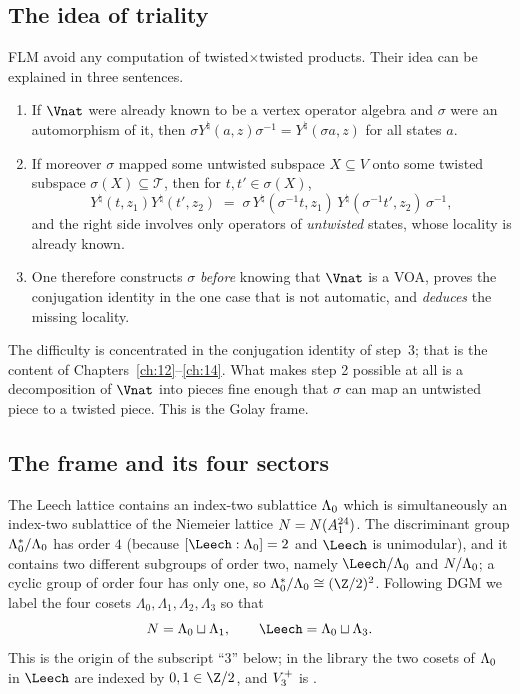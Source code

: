 \subsection{The idea of triality}

FLM avoid any computation of twisted$\times$twisted products.  Their idea can be explained in three
sentences.
\begin{enumerate}
  \item If $\Vnat$ were already known to be a vertex operator algebra and $\sigma$ were an
  automorphism of it, then $\sigma Y^\natural(a,z)\sigma^{-1}=Y^\natural(\sigma a,z)$ for all
  states $a$.
  \item If moreover $\sigma$ mapped some untwisted subspace $X\subseteq V$ onto some twisted
  subspace $\sigma(X)\subseteq\mathcal T$, then for $t,t'\in\sigma(X)$,
  \begin{equation*}
    Y^\natural(t,z_1)Y^\natural(t',z_2)\;=\;\sigma\,Y^\natural(\sigma^{-1}t,z_1)\,
    Y^\natural(\sigma^{-1}t',z_2)\,\sigma^{-1},
  \end{equation*}
  and the right side involves only operators of \emph{untwisted} states, whose locality is
  already known.
  \item One therefore constructs $\sigma$ \emph{before} knowing that $\Vnat$ is a VOA, proves
  the conjugation identity in the one case that is not automatic, and \emph{deduces} the missing
  locality.
\end{enumerate}
The difficulty is concentrated in the conjugation identity of step~3; that is the content of
Chapters~\ref{ch:12}--\ref{ch:14}.  What makes step 2 possible at all is a decomposition of $\Vnat$
into pieces fine enough that $\sigma$ can map an untwisted piece to a twisted piece.  This is the
Golay frame.

\subsection{The frame and its four sectors}

The Leech lattice contains an index-two sublattice $\Lambda_0$ which is simultaneously an index-two
sublattice of the Niemeier lattice $N=N(A_1^{24})$.  The discriminant group
$\Lambda_0^*/\Lambda_0$ has order $4$ (because $[\Leech:\chelLz]=2$ and $\Leech$ is unimodular), and it
contains two different subgroups of order two, namely $\Leech/\chelLz$ and $N/\Lambda_0$;
a cyclic group of order four has only one, so $\chelLz^*/\chelLz\cong(\Z/2)^2$.  Following DGM we
label the four cosets $\Lambda_0,\Lambda_1,\Lambda_2,\Lambda_3$ so that
\begin{equation*}
  \chelN=\Lambda_0\sqcup\Lambda_1,\qquad \Leech=\Lambda_0\sqcup\Lambda_3 .
\end{equation*}
This is the origin of the subscript ``$3$'' below; in the library the two cosets of $\Lambda_0$ in
$\Leech$ are indexed by $0,1\in\Z/2$, and $V_3^{+}$ is .

